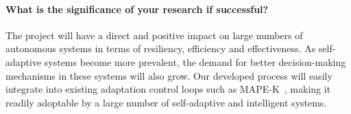 \documentclass[12pt]{article}
\newcommand{\todo}[1]{\textcolor{cyan}{\textbf{[#1]}}}
\begin{document}





















\vspace{-5mm}\paragraph{What is the significance of your research if successful?} The project will have a direct and positive impact on large numbers of autonomous systems in terms of resiliency, efficiency and effectiveness. As self-adaptive systems become more prevalent, the demand for better decision-making mechanisms in these systems will also grow. Our developed process will easily integrate into existing adaptation control loops such as MAPE-K~\cite{kephart2003vision}, making it readily adoptable by a large number of self-adaptive and intelligent systems. %
\end{document}
